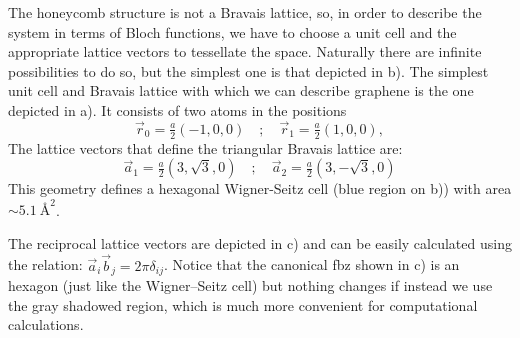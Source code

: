 The honeycomb structure is not a Bravais lattice, so, in order to describe the system in terms of Bloch functions, we have to choose a unit cell and the appropriate lattice vectors to tessellate the space.
Naturally there are infinite possibilities to do so, but the simplest one is that depicted in b).
The simplest unit cell and  Bravais lattice with which we can describe graphene is the one depicted in a). It consists of two atoms in the positions
\begin{equation}
\vec{r}_0 = \tfrac{a}{2}(-1,0,0) \quad;\quad
\vec{r}_1 = \tfrac{a}{2}(1,0,0),
\label{at_pos}
\end{equation}
The lattice vectors that define the triangular Bravais lattice are:
\begin{equation}
\vec{a}_1 = \tfrac{a}{2}\left(3,\sqrt{3},0\right) \quad;\quad
\vec{a}_2 = \tfrac{a}{2}\left(3,-\sqrt{3},0\right)
\label{latt_vec}
\end{equation}
This geometry defines a hexagonal Wigner-Seitz cell (blue region on b)) with area $\sim\SI{5.1}{\angstrom\squared}$.

The reciprocal lattice vectors are depicted in c) and can be easily calculated using the relation: $\vec{a}_i\vec{b}_j=2\pi\delta_{ij}$. Notice that the canonical \ac{fbz} shown in c) is an hexagon (just like the Wigner–Seitz cell) but nothing changes if instead we use the gray shadowed region, which is much more convenient for computational calculations.\\


